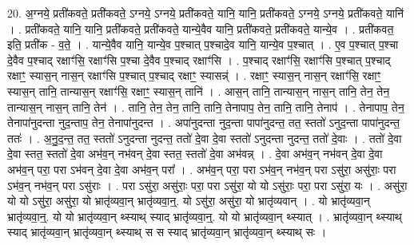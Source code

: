 \documentclass[17pt]{extarticle}
\begin{document}
20. अ॒ग्नये॒ प्रती॑कवते॒ प्रती॑कवते॒ ऽग्नये॒ ऽग्नये॒ प्रती॑कवते॒ यानि॒ यानि॒ प्रती॑कवते॒ ऽग्नये॒ ऽग्नये॒ प्रती॑कवते॒ यानि॑ । . प्रती॑कवते॒ यानि॒ यानि॒ प्रती॑कवते॒ प्रती॑कवते॒ यान्ये॒वैव यानि॒ प्रती॑कवते॒ प्रती॑कवते॒ यान्ये॒व । . प्रती॑कवत॒ इति॒ प्रती॑क - व॒ते॒ । . यान्ये॒वैव यानि॒ यान्ये॒व प॒श्चात् प॒श्चादे॒व यानि॒ यान्ये॒व प॒श्चात् । . ए॒व प॒श्चात् प॒श्चा दे॒वैव प॒श्चाद् रक्षाꣳ॑सि॒ रक्षाꣳ॑सि प॒श्चा दे॒वैव प॒श्चाद् रक्षाꣳ॑सि । . प॒श्चाद् रक्षाꣳ॑सि॒ रक्षाꣳ॑सि प॒श्चात् प॒श्चाद् रक्षाꣳ॒॒ स्यास॒न् नास॒न् रक्षाꣳ॑सि प॒श्चात् प॒श्चाद् रक्षाꣳ॒॒ स्यासन्न्॑ । . रक्षाꣳ॒॒ स्यास॒न् नास॒न् रक्षाꣳ॑सि॒ रक्षाꣳ॒॒ स्यास॒न् तानि॒ तान्यास॒न् रक्षाꣳ॑सि॒ रक्षाꣳ॒॒ स्यास॒न् तानि॑ । . आस॒न् तानि॒ तान्यास॒न् नास॒न् तानि॒ तेन॒ तेन॒ तान्यास॒न् नास॒न् तानि॒ तेन॑ । . तानि॒ तेन॒ तेन॒ तानि॒ तानि॒ तेनापाप॒ तेन॒ तानि॒ तानि॒ तेनाप॑ । . तेनापाप॒ तेन॒ तेनापा॑नुदन्ता नुद॒न्ताप॒ तेन॒ तेनापा॑नुदन्त । . अपा॑नुदन्ता नुद॒न्ता पापा॑नुदन्त॒ तत॒ स्ततो॑ ऽनुद॒न्ता पापा॑नुदन्त॒ ततः॑ । . अ॒नु॒द॒न्त॒ तत॒ स्ततो॑ ऽनुदन्ता नुदन्त॒ ततो॑ दे॒वा दे॒वा स्ततो॑ ऽनुदन्ता नुदन्त॒ ततो॑ दे॒वाः । . ततो॑ दे॒वा दे॒वा स्तत॒ स्ततो॑ दे॒वा अभ॑व॒न् नभ॑वन् दे॒वा स्तत॒ स्ततो॑ दे॒वा अभ॑वन्न् । . दे॒वा अभ॑व॒न् नभ॑वन् दे॒वा दे॒वा अभ॑व॒न् परा॒ परा ऽभ॑वन् दे॒वा दे॒वा अभ॑व॒न् परा᳚ । . अभ॑व॒न् परा॒ परा ऽभ॑व॒न् नभ॑व॒न् परा ऽसु॑रा॒ असु॑राः॒ परा ऽभ॑व॒न् नभ॑व॒न् परा ऽसु॑राः । . परा ऽसु॑रा॒ असु॑राः॒ परा॒ परा ऽसु॑रा॒ यो यो ऽसु॑राः॒ परा॒ परा ऽसु॑रा॒ यः । . असु॑रा॒ यो यो ऽसु॑रा॒ असु॑रा॒ यो भ्रातृ॑व्यवा॒न् भ्रातृ॑व्यवा॒न्॒. यो ऽसु॑रा॒ असु॑रा॒ यो भ्रातृ॑व्यवान् । . यो भ्रातृ॑व्यवा॒न् भ्रातृ॑व्यवा॒न्॒. यो यो भ्रातृ॑व्यवा॒न् थ्स्याथ् स्याद् भ्रातृ॑व्यवा॒न्॒. यो यो भ्रातृ॑व्यवा॒न् थ्स्यात् । . भ्रातृ॑व्यवा॒न् थ्स्याथ् स्याद् भ्रातृ॑व्यवा॒न् भ्रातृ॑व्यवा॒न् थ्स्याथ् स स स्याद् भ्रातृ॑व्यवा॒न् भ्रातृ॑व्यवा॒न् थ्स्याथ् सः । \newline
\end{document}

